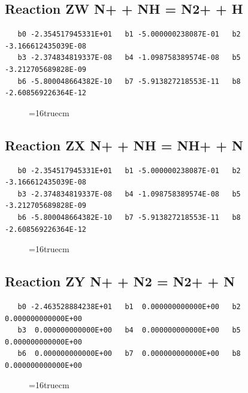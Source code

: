 \documentclass[12pt,dvipdfm]{article}
\begin{document}
\subsection{
Reaction ZW N+ + NH = N2+ + H }
\begin{small}\begin{verbatim}
   b0 -2.354517945331E+01   b1 -5.000000238087E-01   b2 -3.166612435039E-08
   b3 -2.374834819337E-08   b4 -1.098758389574E-08   b5 -3.212705689828E-09
   b6 -5.800048664382E-10   b7 -5.913827218553E-11   b8 -2.608569226364E-12
\end{verbatim}\end{small}
\begin{figure}[h!] \label{n2rates}
\epsfxsize=16truecm
\end{figure}
\newpage

\subsection{
Reaction ZX N+ + NH = NH+ + N }
\begin{small}\begin{verbatim}
   b0 -2.354517945331E+01   b1 -5.000000238087E-01   b2 -3.166612435039E-08
   b3 -2.374834819337E-08   b4 -1.098758389574E-08   b5 -3.212705689828E-09
   b6 -5.800048664382E-10   b7 -5.913827218553E-11   b8 -2.608569226364E-12
\end{verbatim}\end{small}
\begin{figure}[h!] \label{n2rates}
\epsfxsize=16truecm
\end{figure}
\newpage

\subsection{
Reaction ZY N+ + N2 = N2+ + N }
\begin{small}\begin{verbatim}
   b0 -2.463528884238E+01   b1  0.000000000000E+00   b2  0.000000000000E+00
   b3  0.000000000000E+00   b4  0.000000000000E+00   b5  0.000000000000E+00
   b6  0.000000000000E+00   b7  0.000000000000E+00   b8  0.000000000000E+00
\end{verbatim}\end{small}
\begin{figure}[h!] \label{n2rates}
\epsfxsize=16truecm
\end{figure}
\newpage
\end{document}
